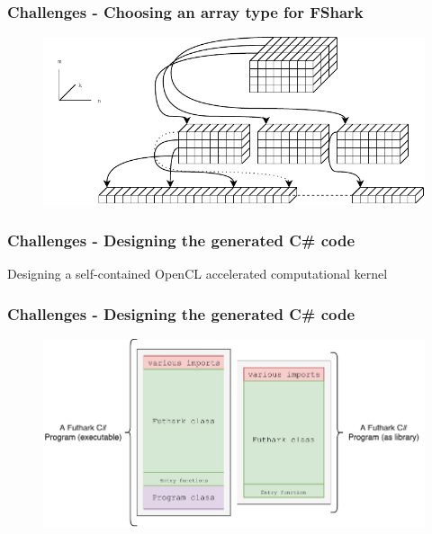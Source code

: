 \documentclass[10pt, compress, usenames, dvipsnames]{beamer}
\begin{document}
\begin{frame}[fragile]
  \frametitle{Challenges - Choosing an array type for FShark}
  \begin{figure}
    \includegraphics[scale=0.85]{./images/jaggedtoflat}
  \end{figure}
\end{frame}

\begin{frame}[fragile]
  \frametitle{Challenges - Designing the generated C\# code}
\begin{center}
  {\Huge Designing a self-contained OpenCL accelerated computational kernel}
\end{center}
\end{frame}

\begin{frame}[fragile]
  \frametitle{Challenges - Designing the generated C\# code}
  \begin{figure}
    \centering
    \includegraphics[scale=0.75]{./images/futharkcs_wide}
  \end{figure}
\end{frame}
\end{document}

